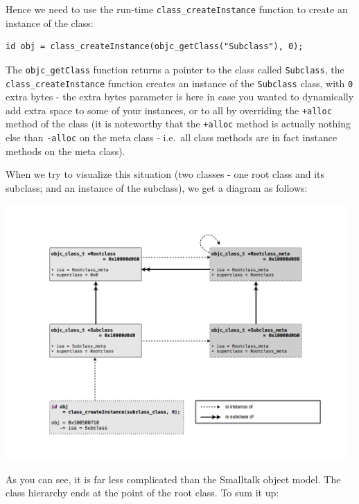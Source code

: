 Hence we need to use the run-time \verb=class_createInstance= function to create an instance of the class:

\begin{verbatim}
id obj = class_createInstance(objc_getClass("Subclass"), 0);
\end{verbatim}

The \verb=objc_getClass= function returns a pointer to the class called \verb=Subclass=, the \verb=class_createInstance= function creates an instance of the \verb=Subclass= class, with \verb=0= extra bytes - the extra bytes parameter is here in case you wanted to dynamically add extra space to some of your instances, or to all by overriding the \verb=+alloc= method of the class (it is noteworthy that the \verb=+alloc= method is actually nothing else than \verb=-alloc= on the meta class - i.e.\ all class methods are in fact instance methods on the meta class).


When we try to visualize this situation (two classes - one root class and its subclass; and an instance of the subclass), we get a diagram as follows:

\includegraphics[width=130mm]{img/metaclass_graph.png}

As you can see, it is far less complicated than the Smalltalk object model. The class hierarchy ends at the point of the root class. To sum it up:


